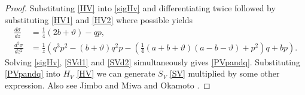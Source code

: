 \documentclass[12pt]{article}
\numberwithin{figure}{section}
\numberwithin{equation}{section}
\numberwithin{table}{section}
\begin{document}
\begin{proof}
Substituting \eqref{HV} into \eqref{sigHv} and differentiating twice followed by substituting \eqref{HV1} and \eqref{HV2} where possible yields
\begin{subequations}
\begin{align}
\frac{d\sigma}{dz}&=\tfrac{1}{4}(2b+\vartheta)-qp,\label{SVd1}\\
\frac{d^2\sigma}{dz^2}&=\frac{1}{z}(q^3p^2-(b+\vartheta)q^2p-(\tfrac{1}{4}(a+b+\vartheta)(a-b-\vartheta)+p^2)q+b p).\label{SVd2}
\end{align}
\end{subequations}
Solving \eqref{sigHv}, \eqref{SVd1} and \eqref{SVd2} simultaneously gives \eqref{PVpandq}.
Substituting \eqref{PVpandq} into $H_{V}$ \eqref{HV} we can generate $S_{V}$ \eqref{SV} multiplied by some other expression.
Also see Jimbo and Miwa \cite{P:2:407} and Okamoto \cite{P:56:367,P:30:305}.
\end{proof}
\end{document}
